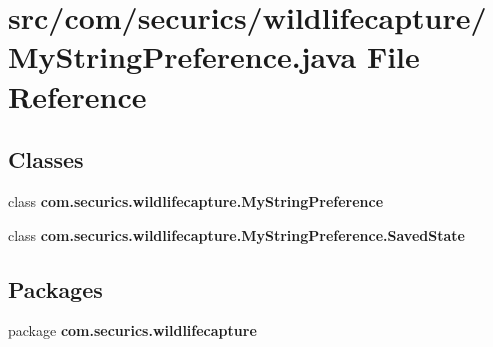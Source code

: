 \section{src/com/securics/wildlifecapture/\+My\+String\+Preference.java File Reference}
\label{_my_string_preference_8java}
\subsection*{Classes}
\begin{DoxyCompactItemize}
\item 
class {\bf com.\+securics.\+wildlifecapture.\+My\+String\+Preference}
\item 
class {\bfseries com.\+securics.\+wildlifecapture.\+My\+String\+Preference.\+Saved\+State}
\end{DoxyCompactItemize}
\subsection*{Packages}
\begin{DoxyCompactItemize}
\item 
package {\bf com.\+securics.\+wildlifecapture}
\end{DoxyCompactItemize}
